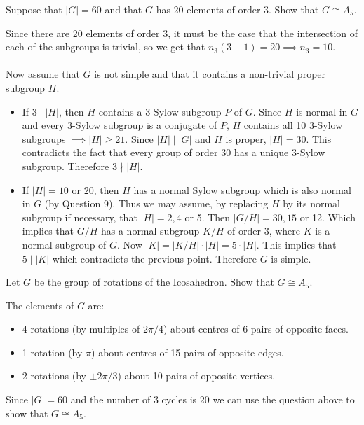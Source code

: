 \documentclass[12pt, answers]{exam}
\begin{document}
\begin{questions}
        \question Suppose that $|G| = 60$ and that $G$ has 20 elements of order 3. Show that $G\cong A_5$.
        \begin{solution}
            Since there are 20 elements of order 3, it must be the case that the intersection of each of the subgroups is
            trivial, so we get that $n_3(3 - 1) = 20 \implies n_3 = 10$. \\ \\
            Now assume that $G$ is not simple and that it contains a non-trivial proper subgroup $H$.
            \begin{itemize}
                \item If $3 \mathrel{|} |H|$, then $H$ contains a $3$-Sylow subgroup $P$ of $G$. Since $H$ is normal in $G$
                      and every $3$-Sylow subgroup is a conjugate of $P$, $H$ contains all 10 3-Sylow subgroups
                      $\implies |H| \ge 21$. Since $|H| \mathrel{|} |G|$ and $H$ is proper, $|H| = 30$. This contradicts
                      the fact that every group of order 30 has a unique 3-Sylow subgroup. Therefore $3 \mathrel{\nmid} |H|$.
                \item If $|H| = 10$ or $20$, then $H$ has a normal Sylow subgroup which is also normal in $G$ (by Question 9).
                    Thus we may assume, by replacing $H$ by its normal subgroup if necessary, that $|H| = 2, 4$ or 5. Then
                    $|G / H| = 30, 15$ or 12. Which implies that $G / H$ has a normal subgroup $K / H$ of order 3, where
                    $K$ is a normal subgroup of $G$. Now $|K| = |K / H| \cdot |H| = 5 \cdot |H|$. This implies that
                    $5 \mathrel{|} |K|$ which contradicts the previous point. Therefore $G$ is simple.
            \end{itemize}
        \end{solution}

        \question Let $G$ be the group of rotations of the Icosahedron. Show that $G\cong A_5$.
        \begin{solution}
            The elements of $G$ are:
            \begin{itemize}
                \item 4 rotations (by multiples of $2\pi / 4$) about centres of 6 pairs of opposite faces.
                \item 1 rotation  (by $\pi$) about centres of 15 pairs of opposite edges.
                \item 2 rotations (by $\pm 2\pi / 3$) about 10 pairs of opposite vertices.
            \end{itemize}
            Since $|G| = 60$ and the number of 3 cycles is 20 we can use the question above to show that $G \cong A_5$.
        \end{solution}
    \end{questions}
\end{document}
